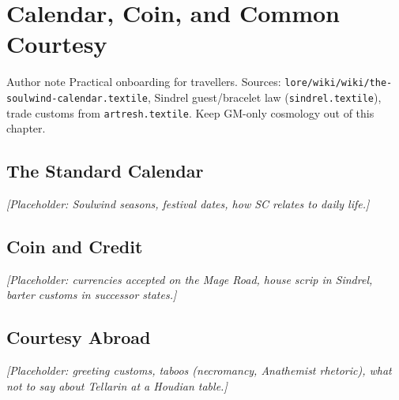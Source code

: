 \chapter{Calendar, Coin, and Common Courtesy}

\begin{DndComment}{Author note}
  Practical onboarding for travellers. Sources:
  \texttt{lore/wiki/wiki/the-soulwind-calendar.textile},
  Sindrel guest/bracelet law (\texttt{sindrel.textile}),
  trade customs from \texttt{artresh.textile}.
  Keep GM-only cosmology out of this chapter.
\end{DndComment}

\section{The Standard Calendar}

\textit{[Placeholder: Soulwind seasons, festival dates, how SC relates to daily life.]}

\section{Coin and Credit}

\textit{[Placeholder: currencies accepted on the Mage Road, house scrip in Sindrel, barter customs in successor states.]}

\section{Courtesy Abroad}

\textit{[Placeholder: greeting customs, taboos (necromancy, Anathemist rhetoric), what not to say about Tellarin at a Houdian table.]}

